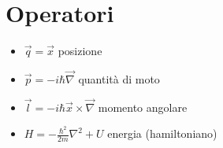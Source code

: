 \documentclass[a4paper]{article}
\begin{document}
        \section{Operatori}
            \begin{itemize}
                \item $\vec{q}=\vec{x}$ posizione
                \item $\vec{p}=-i\hbar\vec{\nabla}$ quantità di moto
                \item $\vec{l}=-i\hbar\vec{x}\times\vec{\nabla}$ momento angolare
                \item $H=-\frac{\hbar^2}{2m}\nabla^2+U$ energia (hamiltoniano)
            \end{itemize}
\end{document}
